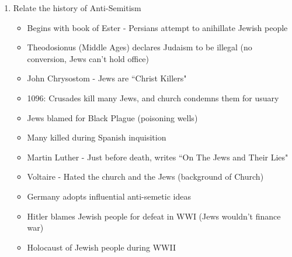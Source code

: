 \documentclass[8pt]{article}
\begin{document}
\begin{enumerate}
        \item Relate the history of Anti-Semitism
            \begin{itemize}
                \item Begins with book of Ester - Persians attempt to anihillate Jewish people
                \item Theodosionus (Middle Ages) declares Judaism to be illegal (no conversion, Jews can't hold office)
                \item John Chrysostom - Jews are ``Christ Killers"
                \item 1096: Crusades kill many Jews, and church condemns them for usuary
                \item Jews blamed for Black Plague (poisoning wells)
                \item Many killed during Spanish inquisition
                \item Martin Luther - Just before death, writes ``On The Jews and Their Lies"
                \item Voltaire - Hated the church and the Jews (background of Church)
                \item Germany adopts influential anti-semetic ideas
                \item Hitler blames Jewish people for defeat in WWI (Jews wouldn't finance war)
                \item Holocaust of Jewish people during WWII
            \end{itemize}
    \end{enumerate}
\end{document}
